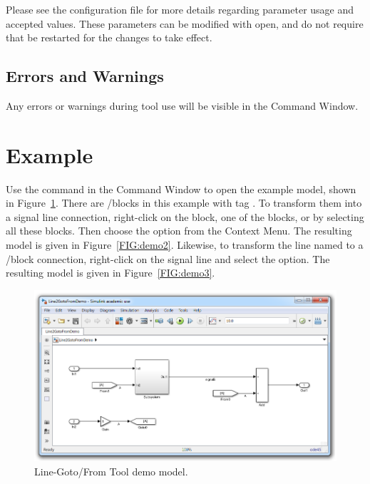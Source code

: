 \documentclass{article}
\makeatletter
\newcommand{\ToolName}{Line-Goto/From Tool\@\xspace}
\newcommand{\menu}[2]{%
	\ifthenelse{\equal{#1}{1}}{Goto/Froms to Line}{}%
  	\ifthenelse{\equal{#1}{2}}{Line to Goto/Froms}{}%
}
\newcommand{\demoName}{\cmd{Line2GotoFromDemo}\@\xspace}
\makeatother
\begin{document}
Please see the configuration file for more details regarding parameter usage and accepted values. These parameters can be modified with \Matlab open, and do not require that \Matlab be restarted for the changes to take effect.

\subsection{Errors and Warnings}
Any errors or warnings during tool use will be visible in the \Matlab Command Window.

\section{Example}

Use the command \demoName in the \Simulink Command Window to open the example model, shown in Figure~\ref{FIG:demo1}. There are \goto/\from blocks in this example with tag . To transform them into a signal line connection, right-click on the \goto block, one of the \from blocks, or by selecting all these blocks. Then choose the  option from the Context Menu. The resulting model is given in Figure~\ref{FIG:demo2}. Likewise, to transform the line named  to a \goto/\from block connection, right-click on the signal line and select the  option. The resulting model is given in Figure~\ref{FIG:demo3}.

\begin{figure}
	\centering
	\includegraphics[width=\textwidth]{../figs/Demo1}
	\caption{\ToolName demo model.}
	\label{FIG:demo1}
\end{figure}
\end{document}
